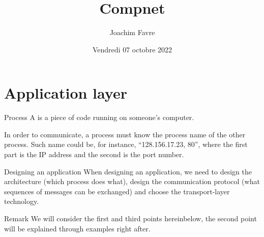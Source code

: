 \documentclass[a4paper]{article}
\title{Compnet}
\author{Joachim Favre}
\date{Vendredi 07 octobre 2022}
\begin{document}
\maketitle


\section{Application layer}
\begin{parag}{Process}
    A  is a piece of code running on someone's computer.

    In order to communicate, a process must know the process name of the other process. Such name could be, for instance, ``128.156.17.23, 80'', where the first part is the IP address and the second is the port number.
\end{parag}

\begin{parag}{Designing an application}
    When designing an application, we need to design the architecture (which process does what), design the communication protocol (what sequences of messages can be exchanged) and choose the transport-layer technology.

    \begin{subparag}{Remark}
        We will consider the first and third points hereinbelow, the second point will be explained through examples right after.
    \end{subparag}
    
\end{parag}
\end{document}
